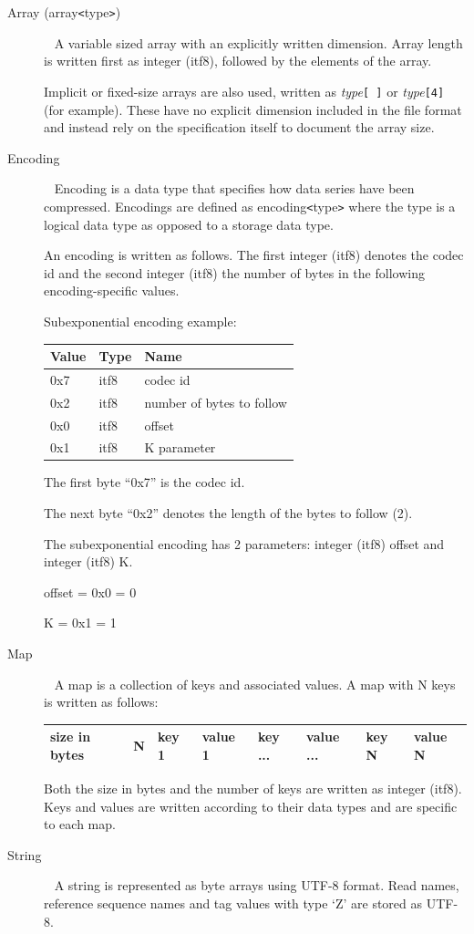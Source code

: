 \documentclass[a4paper]{article}
\begin{document}
\begin{description}
\item[{Array (array\texttt{<}type\texttt{>})}]\ \newline
A variable sized array with an explicitly written dimension.
Array length is written first as integer (itf8), followed by the elements of the array.

Implicit or fixed-size arrays are also used, written as \textit{type}\texttt{[ ]} or \textit{type}\texttt{[4]} (for example).
These have no explicit dimension included in the file format and instead rely on the specification itself to document the array size.


\item[{Encoding}]\ \newline
Encoding is a data type that specifies how data series have been compressed. Encodings 
are defined as encoding\texttt{<}type\texttt{>} where the type is a logical data 
type as opposed to a storage data type.

An encoding is written as follows. The first integer (itf8) denotes the codec id 
and the second integer (itf8) the number of bytes in the following encoding-specific 
values. 

Subexponential encoding example: 

\begin{tabular}{|l|l|l|}
\hline
\textbf{Value} & \textbf{Type} & \textbf{Name}\tabularnewline
\hline
0x7 & itf8 & codec id\tabularnewline
\hline
0x2 & itf8 & number of bytes to follow\tabularnewline
\hline
0x0 & itf8 & offset\tabularnewline
\hline
0x1 & itf8 & K parameter\tabularnewline
\hline
\end{tabular}

The first byte ``0x7'' is the codec id. 

The next byte ``0x2'' denotes the length of the bytes to follow (2). 

The subexponential encoding has 2 parameters: integer (itf8) offset and integer (itf8) K.

offset = 0x0 = 0

K = 0x1 = 1


\item[{Map}]\ \newline
A map is a collection of keys and associated values. A map with N keys is written 
as follows: 

\begin{tabular}{|l|l|l|l|l|l|l|l|}
\hline
size in bytes & N & key 1 & value 1 & key ... & value ... & key N & value N\tabularnewline
\hline
\end{tabular}

Both the size in bytes and the number of keys are written as integer (itf8). Keys 
and values are written according to their data types and are specific to each map.

\item[String]\ \newline
A string is represented as byte arrays using UTF-8 format. Read names, reference 
sequence names and tag values with type `Z' are stored as UTF-8.

\end{description}
\end{document}
